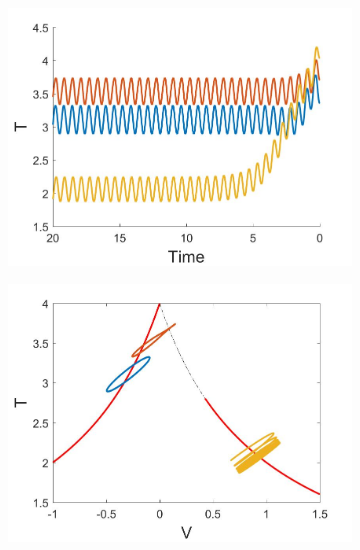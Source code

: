 \begin{figure}[H]
\centering
\begin{subfigure}{.5\textwidth}
  \centering
  \includegraphics[width=\linewidth]{twoD/osc_Ttimeseries.jpg}
  \caption{}
\end{subfigure}%
\begin{subfigure}{.5\textwidth}
  \centering
  \includegraphics[width=\linewidth]{twoD/osc_bif_Tplot.jpg}
  \caption{}
\end{subfigure}
\begin{subfigure}{.5\textwidth}
  \centering

\end{subfigure}
\end{figure}
